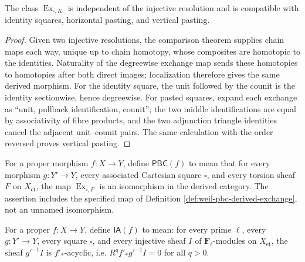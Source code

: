 \begin{lemma}
\label{lemma:weil-pbc-derived-exchange-coherence}
The class $\operatorname{Ex}_{\square,K}$ is independent of the injective
resolution and is compatible with identity squares, horizontal pasting, and
vertical pasting.
\end{lemma}
\begin{proof}
Given two injective resolutions, the comparison theorem supplies chain maps
each way, unique up to chain homotopy, whose composites are homotopic to the
identities.  Naturality of the degreewise exchange map sends these homotopies
to homotopies after both direct images; localization therefore gives the same
derived morphism.  For the identity square, the unit followed by the counit is
the identity sectionwise, hence degreewise.  For pasted squares, expand each
exchange as ``unit, pullback identification, counit''; the two middle
identifications are equal by associativity of fibre products, and the two
adjunction triangle identities cancel the adjacent unit--counit pairs.  The
same calculation with the order reversed proves vertical pasting.
\end{proof}

\begin{definition}
\label{def:weil-pbc-property}
\leanok
For a proper morphism $f:X\to Y$, define $\mathsf{PBC}(f)$ to mean that for
every morphism $g:Y'\to Y$, every associated Cartesian square $\square$, and
every torsion sheaf $F$ on $X_{\mathrm{et}}$, the map
$\operatorname{Ex}_{\square,F}$ is an isomorphism in the derived category.
The assertion includes the specified map of Definition
\ref{def:weil-pbc-derived-exchange}, not an unnamed isomorphism.
\end{definition}

\begin{definition}
\label{def:weil-pbc-injective-acyclicity-property}
For a proper $f:X\to Y$, define $\mathsf{IA}(f)$ to mean: for every prime
$\ell$, every $g:Y'\to Y$, every square $\square$, and every injective sheaf
$I$ of $\mathbf F_\ell$-modules on $X_{\mathrm{et}}$, the sheaf
$g'^{-1}I$ is $f'_* $-acyclic, i.e.
$R^qf'_*g'^{-1}I=0$ for all $q>0$.
\end{definition}

